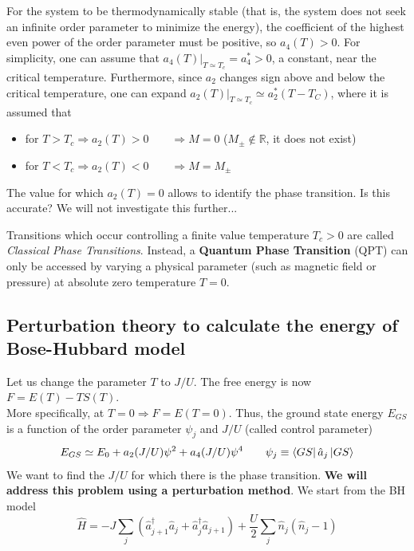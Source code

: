 For the system to be thermodynamically stable (that is, the system does not seek an infinite order parameter to minimize the energy), the coefficient of the highest even power of the order parameter must be positive, so $a_4(T)>0$. For simplicity, one can assume that $a_4(T)|_{T\simeq T_c} = a_4^* >0$, a constant, near the critical temperature. Furthermore, since $a_2$ changes sign above and below the critical temperature, one can expand $a_2(T)|_{T\simeq T_c} \simeq a_2^*(T-T_C)$, where it is assumed that \begin{itemize}
    \item for $T>T_c \Rightarrow a_2(T)>0 \qquad \Rightarrow M=0$ \;\; ($M_\pm \notin \mathbb{R}$, it does not exist)
    \item for $T<T_c \Rightarrow a_2(T)<0 \qquad \Rightarrow M=M_\pm$
\end{itemize}


\begin{center}
    \scalebox{1.2}{  }
\end{center}

The value for which $a_2(T)=0$ allows to identify the phase transition. Is this accurate? We will not investigate this further...

Transitions which occur controlling a finite value temperature $T_c>0$ are called \emph{Classical Phase Transitions}. Instead, a \textbf{Quantum Phase Transition} (QPT) can only be accessed by varying a physical parameter (such as magnetic field or pressure) at absolute zero temperature $T=0$.\\




\subsection{Perturbation theory to calculate the energy of Bose-Hubbard model}

Let us change the parameter $T$ to $J/U$. The free energy is now
$F=E(T) - T S(T)$.\\
%
More specifically, at $T=0 \Rightarrow F = E(T=0)$. Thus, the ground state energy $E_{GS}$ is a function of the order parameter $\psi_j$ and $J/U$ (called control parameter)
\begin{equation}
    E_{GS} \simeq E_0 + a_2(J/U)\psi^2 + a_4(J/U)\psi^4
    \qquad
    \psi_j \equiv \bra{GS}\hat{a}_j\ket{GS}
    \label{eq:landau-bh}
\end{equation}
We want to find the $J/U$ for which there is the phase transition. \textbf{We will address this problem using a perturbation method}. We start from the BH model
\begin{equation*}
    \hat{H} = -J\sum_j\left(
        \hat{a}_{j+1}^\dag\hat{a}_{j} +
        \hat{a}_{j}^\dag\hat{a}_{j+1}
    \right) + \frac{U}{2}\sum_j \hat{n}_j(\hat{n}_j-1)
\end{equation*}

